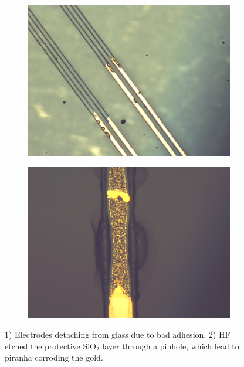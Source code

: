 \documentclass[final]{jyflluk}
\begin{document}
 \begin{figure}
    \centering
    \begin{subfigure}[ht]{0.48\textwidth}
        \centering
        \includegraphics[width=\linewidth]{optical/eledetach.png} 
        \caption{} \label{fig:lileee}
    \end{subfigure}
    \hfill
    \begin{subfigure}[ht]{0.48\textwidth}
        \centering
        \includegraphics[width=\linewidth]{optical/piranha_ate.png} 
        \caption{} \label{fig:lellqqq}
    \end{subfigure}
    \caption{1) Electrodes detaching from glass due to bad adhesion. 2) HF etched the protective $\mathrm{SiO_2}$ layer through a pinhole, which lead to piranha corroding the gold.} \label{fig:eleproblem}
\end{figure}  
\end{document}
